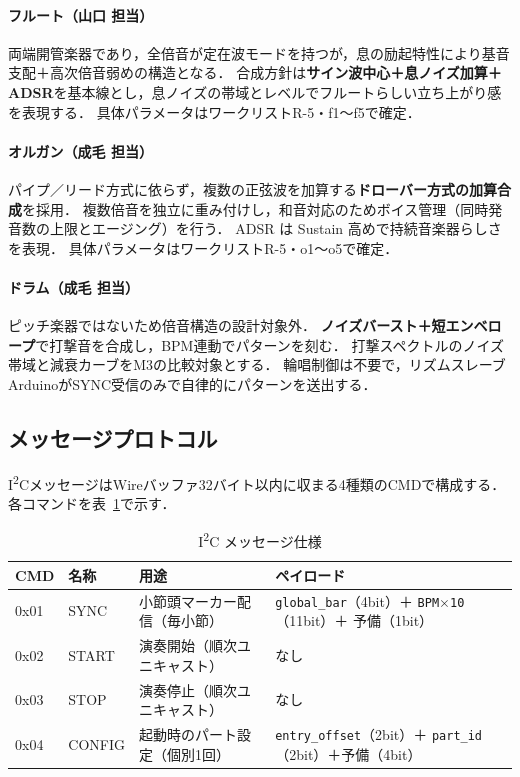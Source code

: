 \documentclass[lualatex,book,paper=a4paper,jafontsize=11.5pt,jafontscale=1.05]{jlreq}
\begin{document}
\paragraph{フルート（山口 担当）}
両端開管楽器であり，全倍音が定在波モードを持つが，息の励起特性により基音支配＋高次倍音弱めの構造となる．
合成方針は\textbf{サイン波中心＋息ノイズ加算＋ADSR}を基本線とし，息ノイズの帯域とレベルでフルートらしい立ち上がり感を表現する．
具体パラメータはワークリストR-5・f1〜f5で確定．

\paragraph{オルガン（成毛 担当）}
パイプ／リード方式に依らず，複数の正弦波を加算する\textbf{ドローバー方式の加算合成}を採用．
複数倍音を独立に重み付けし，和音対応のためボイス管理（同時発音数の上限とエージング）を行う．
ADSR は Sustain 高めで持続音楽器らしさを表現．
具体パラメータはワークリストR-5・o1〜o5で確定．

\paragraph{ドラム（成毛 担当）}
ピッチ楽器ではないため倍音構造の設計対象外．
\textbf{ノイズバースト＋短エンベロープ}で打撃音を合成し，BPM連動でパターンを刻む．
打撃スペクトルのノイズ帯域と減衰カーブをM3の比較対象とする．
輪唱制御は不要で，リズムスレーブArduinoがSYNC受信のみで自律的にパターンを送出する．

\subsection{メッセージプロトコル}
I\textsuperscript{2}CメッセージはWireバッファ32バイト以内に収まる4種類のCMDで構成する．
各コマンドを表~\ref{tab:i2cmsg}で示す．

\begin{longtable}{@{}p{1.2cm} p{1.6cm} p{4.6cm} p{7.2cm}@{}}
\caption{I\textsuperscript{2}C メッセージ仕様}\label{tab:i2cmsg}\\
\toprule
\textbf{CMD} & \textbf{名称} & \textbf{用途} & \textbf{ペイロード} \\
\midrule \endhead
0x01 & SYNC   & 小節頭マーカー配信（毎小節） & \texttt{global\_bar}（4bit）＋ \texttt{BPM$\times$10}（11bit）＋ 予備（1bit） \\
0x02 & START  & 演奏開始（順次ユニキャスト） & なし \\
0x03 & STOP   & 演奏停止（順次ユニキャスト） & なし \\
0x04 & CONFIG & 起動時のパート設定（個別1回） &
  \texttt{entry\_offset}（2bit）＋ \texttt{part\_id}（2bit）＋予備（4bit） \\
\bottomrule
\end{longtable}
\end{document}
